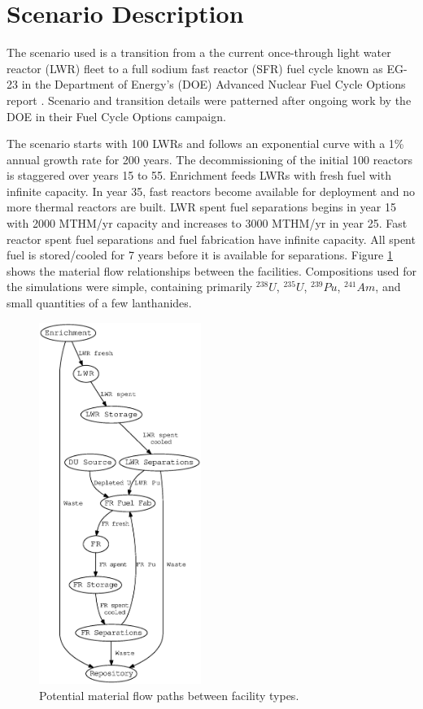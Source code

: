 \documentclass{style}
\begin{document}
\section{Scenario Description}

The scenario used is a transition from a the current once-through light water
reactor (LWR) fleet to a full sodium fast reactor (SFR) fuel cycle known as
EG-23 in the Department of Energy's (DOE) Advanced Nuclear Fuel Cycle Options
report \cite{wigeland_nuclear_2014}. Scenario and transition details were
patterned after ongoing work by the DOE in their Fuel Cycle Options campaign.

The scenario starts with 100 LWRs and follows an exponential curve with a 1\%
annual growth rate for 200 years.  The decommissioning of the initial 100
reactors is staggered over years 15 to 55.  Enrichment feeds LWRs with fresh
fuel with infinite capacity. In year 35, fast reactors become available for
deployment and no more thermal reactors are built.  LWR spent fuel separations
begins in year 15 with 2000 MTHM/yr capacity and increases to 3000 MTHM/yr in
year 25.  Fast reactor spent fuel separations and fuel fabrication have
infinite capacity.  All spent fuel is stored/cooled for 7 years before it is
available for separations. Figure \ref{fig:flow} shows the material flow
relationships between the facilities.  Compositions used for the simulations
were simple, containing primarily $^{238}U$, $^{235}U$, $^{239}Pu$,
$^{241}Am$, and small quantities of a few lanthanides.

\begin{figure}[!h]
    \centering
    \includegraphics[width=0.47\textwidth]{exp2/flow.eps}
    \caption[Material flow paths]{Potential material flow paths between facility types.}
    \label{fig:flow}
\end{figure}
\end{document}

